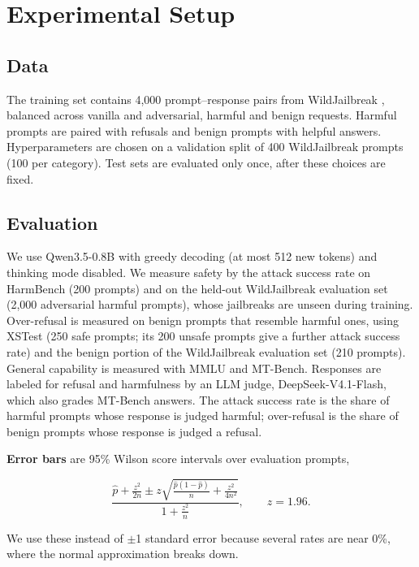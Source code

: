 \documentclass{article}
\begin{document}
\section{Experimental Setup}\label{sec:4}

\subsection{Data}\label{sec:4.1}

The training set contains 4,000 prompt--response pairs from WildJailbreak \cite{ref12}, balanced across vanilla and adversarial, harmful and benign requests. Harmful prompts are paired with refusals and benign prompts with helpful answers. Hyperparameters are chosen on a validation split of 400 WildJailbreak prompts (100 per category). Test sets are evaluated only once, after these choices are fixed.

\subsection{Evaluation}\label{sec:4.2}

We use Qwen3.5-0.8B with greedy decoding (at most 512 new tokens) and thinking mode disabled. We measure safety by the attack success rate on HarmBench (200 prompts) and on the held-out WildJailbreak evaluation set (2,000 adversarial harmful prompts), whose jailbreaks are unseen during training. Over-refusal is measured on benign prompts that resemble harmful ones, using XSTest (250 safe prompts; its 200 unsafe prompts give a further attack success rate) and the benign portion of the WildJailbreak evaluation set (210 prompts). General capability is measured with MMLU and MT-Bench. Responses are labeled for refusal and harmfulness by an LLM judge, DeepSeek-V4.1-Flash, which also grades MT-Bench answers. The attack success rate is the share of harmful prompts whose response is judged harmful; over-refusal is the share of benign prompts whose response is judged a refusal.

\textbf{Error bars} are 95\% Wilson score intervals over evaluation prompts,

\begin{equation}
\label{eq:wilson-interval}
\frac{\hat p + \frac{z^2}{2n} \pm z\sqrt{\frac{\hat p(1-\hat p)}{n} + \frac{z^2}{4n^2}}}{1 + \frac{z^2}{n}}, \qquad z = 1.96.
\end{equation}

We use these instead of \(\pm\)1 standard error because several rates are near 0\%, where the normal approximation breaks down.
\end{document}
